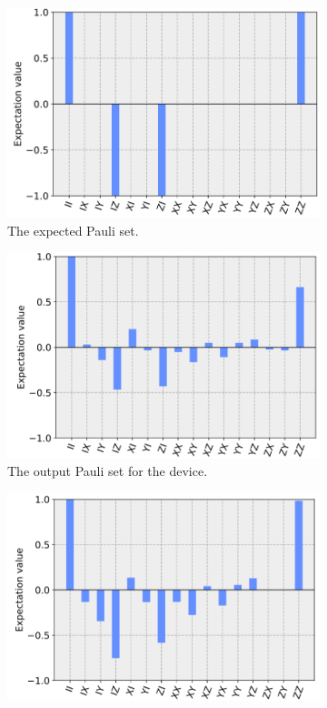 \begin{figure}[h!]
	\begin{subfigure}{.5\textwidth}
		\centering
		\includegraphics[width=.8\linewidth]{images/results/grov_pauli_sim.png}
		\caption{The expected Pauli set.}
		\label{fig:grov_pauli_sim}
	\end{subfigure} \newline
	\begin{subfigure}{.5\textwidth}
		\centering
		\includegraphics[width=.8\linewidth]{images/results/grov_pauli_dev.png}
		\caption{The output Pauli set for the device.}
		\label{fig:grov_pauli_dev}
	\end{subfigure} \newline
	\begin{subfigure}{.5\textwidth}
		\centering
		\includegraphics[width=.8\linewidth]{images/results/grov_pauli_cal.png}

\end{subfigure}
\end{figure}
